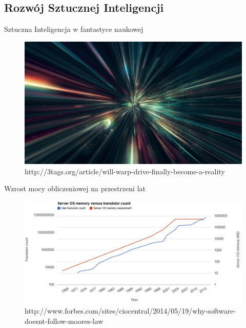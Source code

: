 \documentclass[xcolor=dvipsnames]{beamer}
\begin{document}
\subsection{Rozwój Sztucznej Inteligencji}
\begin{frame}{Sztuczna Inteligencja w fantastyce naukowej}
  \begin{figure}
	\includegraphics[width=\linewidth,height=0.8\textheight,keepaspectratio]{img/warp.jpg}
	\caption{http://3tags.org/article/will-warp-drive-finally-become-a-reality}
  \end{figure}
\end{frame}
\begin{frame}{Wzrost mocy obliczeniowej na przestrzeni lat}
 \begin{figure}
 	\includegraphics[width=\linewidth,height=0.8\textheight,keepaspectratio]{img/computational-power-growth.jpg}
 	\caption{http://www.forbes.com/sites/ciocentral/2014/05/19/why-software-doesnt-follow-moores-law}
  \end{figure}
\end{frame}
\end{document}
